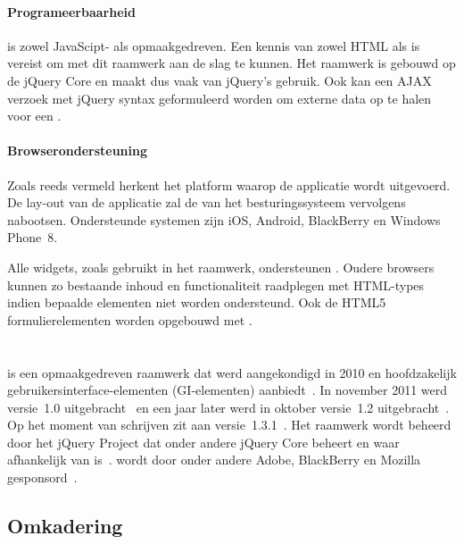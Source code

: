 \paragraph{Programeerbaarheid}
\kendo{} is zowel JavaScipt- als opmaakgedreven.
Een kennis van zowel HTML als \js{} is vereist om met dit raamwerk aan de slag te kunnen.
Het raamwerk is gebouwd op de jQuery Core en maakt dus vaak van jQuery's  gebruik.
Ook kan een AJAX verzoek met jQuery syntax geformuleerd worden om externe data op te halen voor een .

\paragraph{Browserondersteuning}
Zoals reeds vermeld herkent \kendo{} het platform waarop de applicatie wordt uitgevoerd.
De lay-out van de applicatie zal de  van het besturingssysteem vervolgens nabootsen.
Ondersteunde systemen zijn iOS, Android, BlackBerry en Windows Phone~8.

Alle widgets, zoals gebruikt in het raamwerk, ondersteunen .
Oudere browsers kunnen zo bestaande inhoud en functionaliteit raadplegen met  HTML-types indien bepaalde elementen niet worden ondersteund.
Ook de HTML5 formulierelementen worden opgebouwd met .


\section{\jqm}
\label{sec:raamwerk-jqm}
\jqm{} is een opmaakgedreven raamwerk dat werd aangekondigd in 2010 en hoofdzakelijk gebruikersinterface-elementen (GI-elementen) aanbiedt~\cite{Resig2010}.
In november 2011 werd versie~1.0 uitgebracht~\cite{Parker2011} en een jaar later werd in oktober versie~1.2 uitgebracht~\cite{Parker2012}. 
Op het moment van schrijven zit \jqm{} aan versie~1.3.1~\cite{Parker2013b}. 
Het raamwerk wordt beheerd door het jQuery Project dat onder andere jQuery Core beheert en waar \jqm{} afhankelijk van is~\cite{JQuery2012}. 
\jqm{} wordt door onder andere Adobe, BlackBerry en Mozilla gesponsord~\cite{JQuery2012a}.

\subsection{Omkadering}
